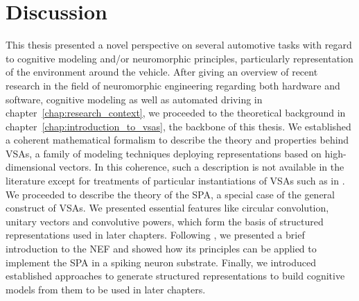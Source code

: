 \chapter{Discussion}%
\label{chap:discussion}

This thesis presented a novel perspective on several automotive tasks with regard to cognitive modeling and/or neuromorphic principles, particularly representation of the environment around the vehicle.
After giving an overview of recent research in the field of neuromorphic engineering regarding both hardware and software, cognitive modeling as well as automated driving in chapter~\ref{chap:research_context}, we proceeded to the theoretical background in chapter~\ref{chap:introduction_to_vsas}, the backbone of this thesis.
We established a coherent mathematical formalism to describe the theory and properties behind \acp{VSA}, a family of modeling techniques deploying representations based on high-dimensional vectors.
In this coherence, such a description is not available in the literature except for treatments of particular instantiations of \acp{VSA} such as in \textcites{Plate1994}{Gayler1998}{Kanerva2009}.
We proceeded to describe the theory of the \ac{SPA}, a special case of the general construct of \acp{VSA}.
We presented essential features like circular convolution, unitary vectors and convolutive powers, which form the basis of structured representations used in later chapters.
Following \textcite{Eliasmith2003}, we presented a brief introduction to the \ac{NEF} and showed how its principles can be applied to implement the \ac{SPA} in a spiking neuron substrate.
Finally, we introduced established approaches to generate structured representations to build cognitive models from them to be used in later chapters.

